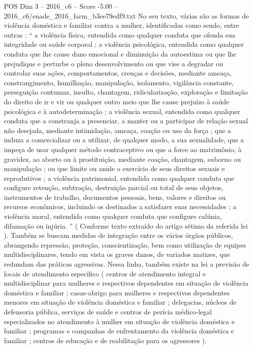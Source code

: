\begin{textsample}{POS Dim 3 – 2016\_c6 – Score -5.00 – 2016\_c6/enade\_2016\_farm\_b3ee79edf9.txt}
No seu texto, várias são as formas de violência doméstica e familiar contra a mulher, identificadas como sendo, entre outras : “ a violência física, entendida como qualquer conduta que ofenda sua integridade ou saúde corporal ; a violência psicológica, entendida como qualquer conduta que lhe cause dano emocional e diminuição da autoestima ou que lhe prejudique e perturbe o pleno desenvolvimento ou que vise a degradar ou controlar suas ações, comportamentos, crenças e decisões, mediante ameaça, constrangimento, humilhação, manipulação, isolamento, vigilância constante, perseguição contumaz, insulto, chantagem, ridicularização, exploração e limitação do direito de ir e vir ou qualquer outro meio que lhe cause prejuízo à saúde psicológica e à autodeterminação ; a violência sexual, entendida como qualquer conduta que a constranja a presenciar, a manter ou a participar de relação sexual não desejada, mediante intimidação, ameaça, coação ou uso da força ; que a induza a comercializar ou a utilizar, de qualquer modo, a sua sexualidade, que a impeça de usar qualquer método contraceptivo ou que a force ao matrimônio, à gravidez, ao aborto ou à prostituição, mediante coação, chantagem, suborno ou manipulação ; ou que limite ou anule o exercício de seus direitos sexuais e reprodutivos ; a violência patrimonial, entendida como qualquer conduta que configure retenção, subtração, destruição parcial ou total de seus objetos, instrumentos de trabalho, documentos pessoais, bens, valores e direitos ou recursos econômicos, incluindo os destinados a satisfazer suas necessidades ; a violência moral, entendida como qualquer conduta que configure calúnia, difamação ou injúria. ” ( Conforme texto extraído do artigo sétimo da referida lei ).
Também se buscam medidas de integração entre os vários órgãos públicos, abrangendo repressão, proteção, conscientização, bem como utilização de equipes multidisciplinares, tendo em vista os graves danos, de variados matizes, que redundam das práticas agressivas.
Nessa linha, também existe na lei a previsão de locais de atendimento específico ( centros de atendimento integral e multidisciplinar para mulheres e respectivos dependentes em situação de violência doméstica e familiar ; casas-abrigo para mulheres e respectivos dependentes menores em situação de violência doméstica e familiar ; delegacias, núcleos de defensoria pública, serviços de saúde e centros de perícia médico-legal especializados no atendimento à mulher em situação de violência doméstica e familiar ; programas e campanhas de enfrentamento da violência doméstica e familiar ; centros de educação e de reabilitação para os agressores ).

\end{textsample}
